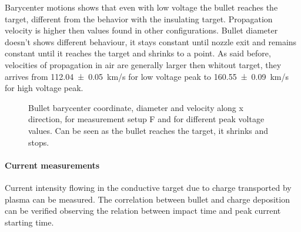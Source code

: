 Barycenter motions shows that even with low voltage the bullet reaches the target, different from the behavior with the insulating target. Propagation velocity is higher then values found in other configurations.
Bullet diameter doesn't shows different behaviour, it stays constant until nozzle exit and remains constant until it reaches the target and shrinks to a point. As said before, velocities of propagation in air are generally larger then whitout target, they arrives from \SI{112.04(5)}{\kilo\meter/\second} for low voltage peak to \SI{160.55(9)}{\kilo\meter/\second} for high voltage peak.
\begin{figure}
 \centering
 \hfill
 \caption{Bullet barycenter coordinate, diameter and velocity along x direction, for measurement setup F and for different peak voltage values. Can be seen as the bullet reaches the target, it shrinks and stops.}
 \label{fig:elio_a_xb}
\end{figure}

\paragraph{Current measurements}
Current intensity flowing in the conductive target due to charge transported by plasma can be measured. The correlation between bullet and charge deposition can be verified observing the relation between impact time and peak current starting time.

